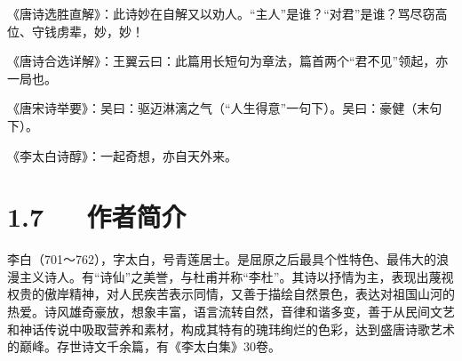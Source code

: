 \documentclass[letterpaper,12pt,english]{sphinxmanual}
\begin{document}
《唐诗选胜直解》：此诗妙在自解又以劝人。“主人”是谁？“对君”是谁？骂尽窃高位、守钱虏辈，妙，妙！

《唐诗合选详解》：王翼云曰：此篇用长短句为章法，篇首两个“君不见”领起，亦一局也。

《唐宋诗举要》：吴曰：驱迈淋漓之气（“人生得意”一句下）。吴曰：豪健（末句下）。

《李太白诗醇》：一起奇想，亦自天外来。


\section{1.7   作者简介}
\label{\detokenize{p01_u6563_u6587/_u674e_u767d-_u5c06_u8fdb_u9152:id9}}
李白（701～762），字太白，号青莲居士。是屈原之后最具个性特色、最伟大的浪漫主义诗人。有“诗仙”之美誉，与杜甫并称“李杜”。其诗以抒情为主，表现出蔑视权贵的傲岸精神，对人民疾苦表示同情，又善于描绘自然景色，表达对祖国山河的热爱。诗风雄奇豪放，想象丰富，语言流转自然，音律和谐多变，善于从民间文艺和神话传说中吸取营养和素材，构成其特有的瑰玮绚烂的色彩，达到盛唐诗歌艺术的巅峰。存世诗文千余篇，有《李太白集》30卷。
\end{document}
